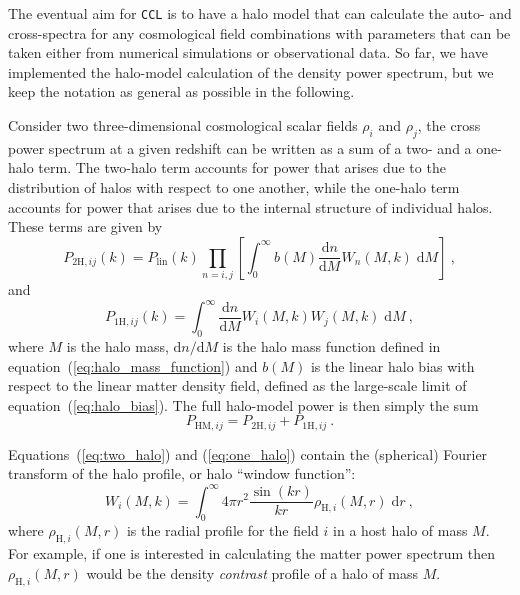 \documentclass[\docopts]{\docclass}
\newcommand{\ccl}{{\tt CCL}\xspace}
\begin{document}
The eventual aim for \ccl is to have a halo model that can calculate the auto- and cross-spectra for any cosmological field combinations with parameters that can be taken either from numerical simulations or observational data. So far, we have implemented the halo-model calculation of the density power spectrum, but we keep the notation as general as possible in the following.

Consider two three-dimensional cosmological scalar fields $\rho_i$ and $\rho_j$, the cross power spectrum at a given redshift can be written as a sum of a two- and a one-halo term. The two-halo term accounts for power that arises due to the distribution of halos with respect to one another, while the one-halo term accounts for power that arises due to the internal structure of individual halos. These terms are given by
\begin{equation}
P_{2\mathrm{H},ij}(k)=P_{\mathrm{lin}}(k)
\prod_{n=i,j}\left[\int_0^\infty b(M)\frac{\mathrm{d}n}{\mathrm{d}M}W_n(M,k)\;\mathrm{d}M\right]\ ,
\label{eq:two_halo}
\end{equation}
and
\begin{equation}
P_{1\mathrm{H},ij}(k)=\int_0^\infty \frac{\mathrm{d}n}{\mathrm{d}M}W_i(M,k)W_j(M,k)\;\mathrm{d}M\ ,
\label{eq:one_halo}
\end{equation}
where $M$ is the halo mass, $\mathrm{d}n/\mathrm{d}M$ is the halo mass function defined in equation~(\ref{eq:halo_mass_function}) and $b(M)$ is the linear halo bias with respect to the linear matter density field, defined as the large-scale limit of equation~(\ref{eq:halo_bias}). The full halo-model power is then simply the sum
\begin{equation}
P_{\mathrm{HM},ij}=P_{2\mathrm{H},ij}+P_{1\mathrm{H},ij}\ .
\label{eq:halo_model_power}
\end{equation}

Equations~(\ref{eq:two_halo}) and (\ref{eq:one_halo}) contain the (spherical) Fourier transform of the halo profile, or halo ``window function'':
\begin{equation} 
W_i(M,k)=\int_0^\infty4\pi r^2\frac{\sin(kr)}{kr}\rho_{\mathrm{H},i}(M,r)\;\mathrm{d}r\ ,
\label{eq:window_function}
\end{equation}
where $\rho_{\mathrm{H},i}(M,r)$ is the radial profile for the field $i$ in a host halo of mass $M$. For example, if one is interested in calculating the matter power spectrum then $\rho_{\mathrm{H},i}(M,r)$ would be the density \emph{contrast} profile of a halo of mass $M$.
\end{document}
